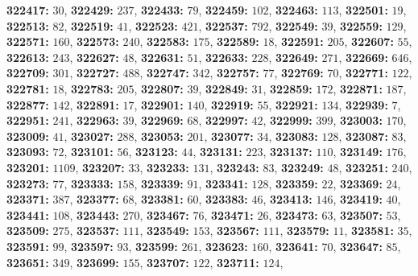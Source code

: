 \textsf{\bfseries 322417:} $30$, \textsf{\bfseries 322429:} $237$, \textsf{\bfseries 322433:} $79$, \textsf{\bfseries 322459:} $102$, \textsf{\bfseries 322463:} $113$, \textsf{\bfseries 322501:} $19$, \textsf{\bfseries 322513:} $82$, \textsf{\bfseries 322519:} $41$, \textsf{\bfseries 322523:} $421$, \textsf{\bfseries 322537:} $792$, \textsf{\bfseries 322549:} $39$, \textsf{\bfseries 322559:} $129$, \textsf{\bfseries 322571:} $160$, \textsf{\bfseries 322573:} $240$, \textsf{\bfseries 322583:} $175$, \textsf{\bfseries 322589:} $18$, \textsf{\bfseries 322591:} $205$, \textsf{\bfseries 322607:} $55$, \textsf{\bfseries 322613:} $243$, \textsf{\bfseries 322627:} $48$, \textsf{\bfseries 322631:} $51$, \textsf{\bfseries 322633:} $228$, \textsf{\bfseries 322649:} $271$, \textsf{\bfseries 322669:} $646$, \textsf{\bfseries 322709:} $301$, \textsf{\bfseries 322727:} $488$, \textsf{\bfseries 322747:} $342$, \textsf{\bfseries 322757:} $77$, \textsf{\bfseries 322769:} $70$, \textsf{\bfseries 322771:} $122$, \textsf{\bfseries 322781:} $18$, \textsf{\bfseries 322783:} $205$, \textsf{\bfseries 322807:} $39$, \textsf{\bfseries 322849:} $31$, \textsf{\bfseries 322859:} $172$, \textsf{\bfseries 322871:} $187$, \textsf{\bfseries 322877:} $142$, \textsf{\bfseries 322891:} $17$, \textsf{\bfseries 322901:} $140$, \textsf{\bfseries 322919:} $55$, \textsf{\bfseries 322921:} $134$, \textsf{\bfseries 322939:} $7$, \textsf{\bfseries 322951:} $241$, \textsf{\bfseries 322963:} $39$, \textsf{\bfseries 322969:} $68$, \textsf{\bfseries 322997:} $42$, \textsf{\bfseries 322999:} $399$, \textsf{\bfseries 323003:} $170$, \textsf{\bfseries 323009:} $41$, \textsf{\bfseries 323027:} $288$, \textsf{\bfseries 323053:} $201$, \textsf{\bfseries 323077:} $34$, \textsf{\bfseries 323083:} $128$, \textsf{\bfseries 323087:} $83$, \textsf{\bfseries 323093:} $72$, \textsf{\bfseries 323101:} $56$, \textsf{\bfseries 323123:} $44$, \textsf{\bfseries 323131:} $223$, \textsf{\bfseries 323137:} $110$, \textsf{\bfseries 323149:} $176$, \textsf{\bfseries 323201:} $1109$, \textsf{\bfseries 323207:} $33$, \textsf{\bfseries 323233:} $131$, \textsf{\bfseries 323243:} $83$, \textsf{\bfseries 323249:} $48$, \textsf{\bfseries 323251:} $240$, \textsf{\bfseries 323273:} $77$, \textsf{\bfseries 323333:} $158$, \textsf{\bfseries 323339:} $91$, \textsf{\bfseries 323341:} $128$, \textsf{\bfseries 323359:} $22$, \textsf{\bfseries 323369:} $24$, \textsf{\bfseries 323371:} $387$, \textsf{\bfseries 323377:} $68$, \textsf{\bfseries 323381:} $60$, \textsf{\bfseries 323383:} $46$, \textsf{\bfseries 323413:} $146$, \textsf{\bfseries 323419:} $40$, \textsf{\bfseries 323441:} $108$, \textsf{\bfseries 323443:} $270$, \textsf{\bfseries 323467:} $76$, \textsf{\bfseries 323471:} $26$, \textsf{\bfseries 323473:} $63$, \textsf{\bfseries 323507:} $53$, \textsf{\bfseries 323509:} $275$, \textsf{\bfseries 323537:} $111$, \textsf{\bfseries 323549:} $153$, \textsf{\bfseries 323567:} $111$, \textsf{\bfseries 323579:} $11$, \textsf{\bfseries 323581:} $35$, \textsf{\bfseries 323591:} $99$, \textsf{\bfseries 323597:} $93$, \textsf{\bfseries 323599:} $261$, \textsf{\bfseries 323623:} $160$, \textsf{\bfseries 323641:} $70$, \textsf{\bfseries 323647:} $85$, \textsf{\bfseries 323651:} $349$, \textsf{\bfseries 323699:} $155$, \textsf{\bfseries 323707:} $122$, \textsf{\bfseries 323711:} $124$, 
